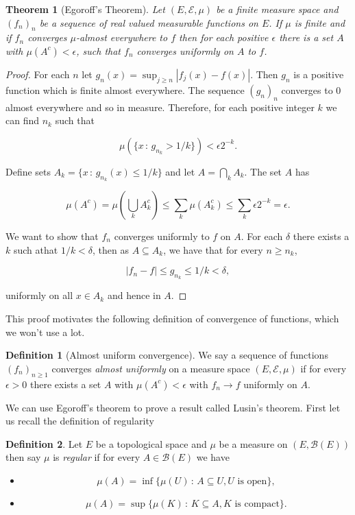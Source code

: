 \documentclass[
]{book}
\providecommand{\tightlist}{%
  \setlength{\itemsep}{0pt}\setlength{\parskip}{0pt}}
\newtheorem{theorem}{Theorem}[chapter]
\theoremstyle{definition}
\newtheorem{definition}{Definition}[chapter]
\theoremstyle{definition}
\theoremstyle{definition}
\theoremstyle{definition}
\theoremstyle{remark}
\begin{document}
\begin{theorem}[Egoroff's Theorem]
Let \((E, \mathcal{E}, \mu)\) be a finite measure space and \((f_n)_n\) be a sequence of real valued measurable functions on \(E\). If \(\mu\) is finite and if \(f_n\) converges \(\mu\)-almost everywhere to \(f\) then for each positive \(\epsilon\) there is a set \(A\) with \(\mu(A^c)< \epsilon\), such that \(f_n\) converges uniformly on \(A\) to \(f\).
\end{theorem}

\begin{proof}
For each \(n\) let \(g_n(x) = \sup_{j \geq n}|f_j(x)-f(x)|\). Then \(g_n\) is a positive function which is finite almost everywhere. The sequence \((g_n)_n\) converges to 0 almost everywhere and so in measure. Therefore, for each positive integer \(k\) we can find \(n_k\) such that

\[ \mu \left( \{ x \,:\, g_{n_k} > 1/k \} \right) < \epsilon 2^{-k}.  \]

Define sets \(A_k = \{ x\,:\, g_{n_k}(x) \leq 1/k\}\) and let \(A= \bigcap_k A_k\). The set \(A\) has

\[ \mu(A^c) = \mu \left( \bigcup_k A_k^c \right) \leq \sum_k \mu(A_k^c) \leq \sum_k \epsilon 2^{-k} = \epsilon. \]

We want to show that \(f_n\) converges uniformly to \(f\) on \(A\). For each \(\delta\) there exists a \(k\) such athat \(1/k < \delta\), then as \(A \subseteq A_k\), we have that for every \(n \geq n_k\),

\[ |f_n - f| \leq g_{n_k} \leq 1/k < \delta, \]

uniformly on all \(x \in A_k\) and hence in \(A\).
\end{proof}

This proof motivates the following definition of convergence of functions, which we won't use a lot.

\begin{definition}[Almost uniform convergence]
We say a sequence of functions \((f_n)_{n \geq 1}\) converges \emph{almost uniformly} on a measure space \((E, \mathcal{E}, \mu)\) if for every \(\epsilon >0\) there exists a set \(A\) with \(\mu(A^c)< \epsilon\) with \(f_n \rightarrow f\) uniformly on \(A\).
\end{definition}

We can use Egoroff's theorem to prove a result called Lusin's theorem. First let us recall the definition of regularity

\begin{definition}

Let \(E\) be a topological space and \(\mu\) be a measure on \((E, \mathcal{B}(E))\) then say \(\mu\) is \emph{regular} if for every \(A \in \mathcal{B}(E)\) we have

\begin{itemize}
\tightlist
\item
  \[\mu(A) = \inf \{ \mu(U) \,:\, A \subseteq U, \mbox{$U$ is open}\},\]
\item
  \[\mu(A) = \sup \{ \mu(K) \,:\, K \subseteq A, \mbox{$K$ is compact}\}.\]
\end{itemize}

\end{definition}
\end{document}
